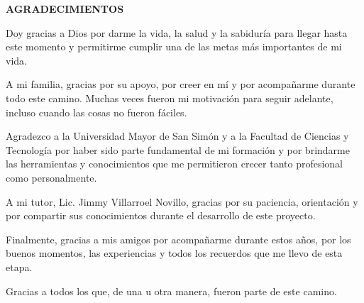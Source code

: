 \clearpage

\thispagestyle{plain}

\begin{center}

    {\Large \bfseries AGRADECIMIENTOS}

\end{center}

\vspace{0.8cm}

Doy gracias a Dios por darme la vida, la salud y la sabiduría para llegar hasta este momento y permitirme cumplir una de las metas más importantes de mi vida.

A mi familia, gracias por su apoyo, por creer en mí y por acompañarme durante todo este camino. Muchas veces fueron mi motivación para seguir adelante, incluso cuando las cosas no fueron fáciles.

Agradezco a la Universidad Mayor de San Simón y a la Facultad de Ciencias y Tecnología por haber sido parte fundamental de mi formación y por brindarme las herramientas y conocimientos que me permitieron crecer tanto profesional como personalmente.

A mi tutor, Lic. Jimmy Villarroel Novillo, gracias por su paciencia, orientación y por compartir sus conocimientos durante el desarrollo de este proyecto.

Finalmente, gracias a mis amigos por acompañarme durante estos años, por los buenos momentos, las experiencias y todos los recuerdos que me llevo de esta etapa.

Gracias a todos los que, de una u otra manera, fueron parte de este camino.

\vfill
